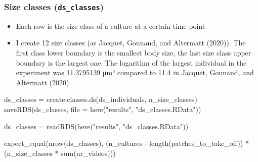 \documentclass[
]{article}
\newenvironment{Shaded}{\begin{snugshade}}{\end{snugshade}}
\newcommand{\AttributeTok}[1]{\textcolor[rgb]{0.77,0.63,0.00}{#1}}
\newcommand{\FunctionTok}[1]{\textcolor[rgb]{0.00,0.00,0.00}{#1}}
\newcommand{\NormalTok}[1]{#1}
\newcommand{\OtherTok}[1]{\textcolor[rgb]{0.56,0.35,0.01}{#1}}
\newcommand{\SpecialCharTok}[1]{\textcolor[rgb]{0.00,0.00,0.00}{#1}}
\newcommand{\StringTok}[1]{\textcolor[rgb]{0.31,0.60,0.02}{#1}}
\providecommand{\tightlist}{%
  \setlength{\itemsep}{0pt}\setlength{\parskip}{0pt}}
\begin{document}
\hypertarget{size-classes-ds_classes}{%
\subsubsection{\texorpdfstring{Size classes
(\texttt{ds\_classes})}{Size classes (ds\_classes)}}\label{size-classes-ds_classes}}

\begin{itemize}
\tightlist
\item
  Each row is the size class of a culture at a certain time point
\item
  I create 12 size classes (as Jacquet, Gounand, and Altermatt (2020)).
  The first class lower boundary is the smallest body size, the last
  size class upper boundary is the largest one. The logarithm of the
  largest individual in the experiment was 11.3795139 μm² compared to
  11.4 in Jacquet, Gounand, and Altermatt (2020).
\end{itemize}

\begin{Shaded}
\begin{Highlighting}[]
\NormalTok{ds\_classes }\OtherTok{=} \FunctionTok{create.classes.ds}\NormalTok{(ds\_individuals,}
\NormalTok{                               n\_size\_classes)}
\FunctionTok{saveRDS}\NormalTok{(ds\_classes, }\AttributeTok{file =} \FunctionTok{here}\NormalTok{(}\StringTok{"results"}\NormalTok{, }\StringTok{"ds\_classes.RData"}\NormalTok{))}
\end{Highlighting}
\end{Shaded}

\begin{Shaded}
\begin{Highlighting}[]
\NormalTok{ds\_classes }\OtherTok{=} \FunctionTok{readRDS}\NormalTok{(}\FunctionTok{here}\NormalTok{(}\StringTok{"results"}\NormalTok{, }\StringTok{"ds\_classes.RData"}\NormalTok{))}

\FunctionTok{expect\_equal}\NormalTok{(}\FunctionTok{nrow}\NormalTok{(ds\_classes),}
\NormalTok{             (n\_cultures }\SpecialCharTok{{-}} \FunctionTok{length}\NormalTok{(patches\_to\_take\_off)) }\SpecialCharTok{*}\NormalTok{ (n\_size\_classes }\SpecialCharTok{*} \FunctionTok{sum}\NormalTok{(nr\_videos)))}
\end{Highlighting}
\end{Shaded}
\end{document}
